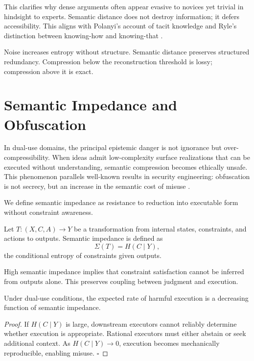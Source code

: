 This clarifies why dense arguments often appear evasive to novices yet trivial in hindsight to experts. Semantic distance does not destroy information; it defers accessibility. This aligns with Polanyi’s account of tacit knowledge \cite{polanyi1966} and Ryle’s distinction between knowing-how and knowing-that \cite{ryle1949}.

Noise increases entropy without structure. Semantic distance preserves structured redundancy. Compression below the reconstruction threshold is lossy; compression above it is exact.

\section{Semantic Impedance and Obfuscation}

In dual-use domains, the principal epistemic danger is not ignorance but over-compressibility. When ideas admit low-complexity surface realizations that can be executed without understanding, semantic compression becomes ethically unsafe. This phenomenon parallels well-known results in security engineering: obfuscation is not secrecy, but an increase in the semantic cost of misuse \cite{barak2001,abadi2017}.

We define semantic impedance as resistance to reduction into executable form without constraint awareness.

\begin{definition}
Let $T : (X,C,A) \rightarrow Y$ be a transformation from internal states, constraints, and actions to outputs. Semantic impedance is defined as
\[
\Sigma(T) = H(C \mid Y),
\]
the conditional entropy of constraints given outputs.
\end{definition}

High semantic impedance implies that constraint satisfaction cannot be inferred from outputs alone. This preserves coupling between judgment and execution.

\begin{lemma}
Under dual-use conditions, the expected rate of harmful execution is a decreasing function of semantic impedance.
\end{lemma}

\begin{proof}
If $H(C \mid Y)$ is large, downstream executors cannot reliably determine whether execution is appropriate. Rational executors must either abstain or seek additional context. As $H(C \mid Y) \to 0$, execution becomes mechanically reproducible, enabling misuse. \hfill $\square$
\end{proof}

